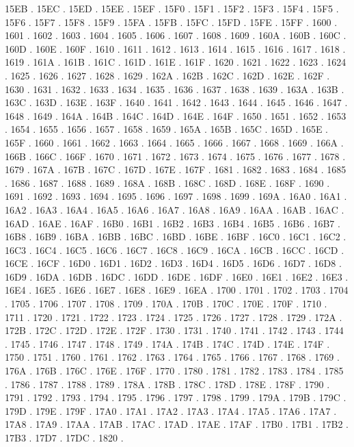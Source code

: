 15EB .
15EC .
15ED .
15EE .
15EF .
15F0 .
15F1 .
15F2 .
15F3 .
15F4 .
15F5 .
15F6 .
15F7 .
15F8 .
15F9 .
15FA .
15FB .
15FC .
15FD .
15FE .
15FF .
1600 .
1601 .
1602 .
1603 .
1604 .
1605 .
1606 .
1607 .
1608 .
1609 .
160A .
160B .
160C .
160D .
160E .
160F .
1610 .
1611 .
1612 .
1613 .
1614 .
1615 .
1616 .
1617 .
1618 .
1619 .
161A .
161B .
161C .
161D .
161E .
161F .
1620 .
1621 .
1622 .
1623 .
1624 .
1625 .
1626 .
1627 .
1628 .
1629 .
162A .
162B .
162C .
162D .
162E .
162F .
1630 .
1631 .
1632 .
1633 .
1634 .
1635 .
1636 .
1637 .
1638 .
1639 .
163A .
163B .
163C .
163D .
163E .
163F .
1640 .
1641 .
1642 .
1643 .
1644 .
1645 .
1646 .
1647 .
1648 .
1649 .
164A .
164B .
164C .
164D .
164E .
164F .
1650 .
1651 .
1652 .
1653 .
1654 .
1655 .
1656 .
1657 .
1658 .
1659 .
165A .
165B .
165C .
165D .
165E .
165F .
1660 .
1661 .
1662 .
1663 .
1664 .
1665 .
1666 .
1667 .
1668 .
1669 .
166A .
166B .
166C .
166F .
1670 .
1671 .
1672 .
1673 .
1674 .
1675 .
1676 .
1677 .
1678 .
1679 .
167A .
167B .
167C .
167D .
167E .
167F .
1681 .
1682 .
1683 .
1684 .
1685 .
1686 .
1687 .
1688 .
1689 .
168A .
168B .
168C .
168D .
168E .
168F .
1690 .
1691 .
1692 .
1693 .
1694 .
1695 .
1696 .
1697 .
1698 .
1699 .
169A .
16A0 .
16A1 .
16A2 .
16A3 .
16A4 .
16A5 .
16A6 .
16A7 .
16A8 .
16A9 .
16AA .
16AB .
16AC .
16AD .
16AE .
16AF .
16B0 .
16B1 .
16B2 .
16B3 .
16B4 .
16B5 .
16B6 .
16B7 .
16B8 .
16B9 .
16BA .
16BB .
16BC .
16BD .
16BE .
16BF .
16C0 .
16C1 .
16C2 .
16C3 .
16C4 .
16C5 .
16C6 .
16C7 .
16C8 .
16C9 .
16CA .
16CB .
16CC .
16CD .
16CE .
16CF .
16D0 .
16D1 .
16D2 .
16D3 .
16D4 .
16D5 .
16D6 .
16D7 .
16D8 .
16D9 .
16DA .
16DB .
16DC .
16DD .
16DE .
16DF .
16E0 .
16E1 .
16E2 .
16E3 .
16E4 .
16E5 .
16E6 .
16E7 .
16E8 .
16E9 .
16EA .
1700 .
1701 .
1702 .
1703 .
1704 .
1705 .
1706 .
1707 .
1708 .
1709 .
170A .
170B .
170C .
170E .
170F .
1710 .
1711 .
1720 .
1721 .
1722 .
1723 .
1724 .
1725 .
1726 .
1727 .
1728 .
1729 .
172A .
172B .
172C .
172D .
172E .
172F .
1730 .
1731 .
1740 .
1741 .
1742 .
1743 .
1744 .
1745 .
1746 .
1747 .
1748 .
1749 .
174A .
174B .
174C .
174D .
174E .
174F .
1750 .
1751 .
1760 .
1761 .
1762 .
1763 .
1764 .
1765 .
1766 .
1767 .
1768 .
1769 .
176A .
176B .
176C .
176E .
176F .
1770 .
1780 .
1781 .
1782 .
1783 .
1784 .
1785 .
1786 .
1787 .
1788 .
1789 .
178A .
178B .
178C .
178D .
178E .
178F .
1790 .
1791 .
1792 .
1793 .
1794 .
1795 .
1796 .
1797 .
1798 .
1799 .
179A .
179B .
179C .
179D .
179E .
179F .
17A0 .
17A1 .
17A2 .
17A3 .
17A4 .
17A5 .
17A6 .
17A7 .
17A8 .
17A9 .
17AA .
17AB .
17AC .
17AD .
17AE .
17AF .
17B0 .
17B1 .
17B2 .
17B3 .
17D7 .
17DC .
1820 .
